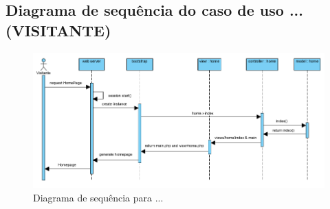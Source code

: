 \FloatBarrier\subsection{Diagrama de sequência do caso de uso ...(VISITANTE)}



\begin{figure}[!htb]
	\centering
	\includegraphics[width=\textwidth]{figuras/sequence_diagram_visitante.png}
	\caption{Diagrama de sequência para ...}
	\label{fig:sequência_visitamte}
\end{figure}